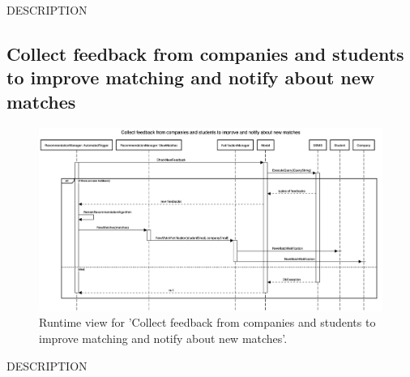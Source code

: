 DESCRIPTION


\subsection{Collect feedback from companies and students to improve matching and notify about new matches}
\begin{figure}[H]
    \begin{center}
        \includegraphics[width=0.8\linewidth]{DD/LaTeX/Images/RuntimeView/CollectFeedbackToImprove.png}
        \caption{Runtime view for 'Collect feedback from companies and students to improve matching and notify about new matches'.}
        \label{fig:runtime_CollectFeedbackToImprove}%
    \end{center}
\end{figure}

DESCRIPTION





